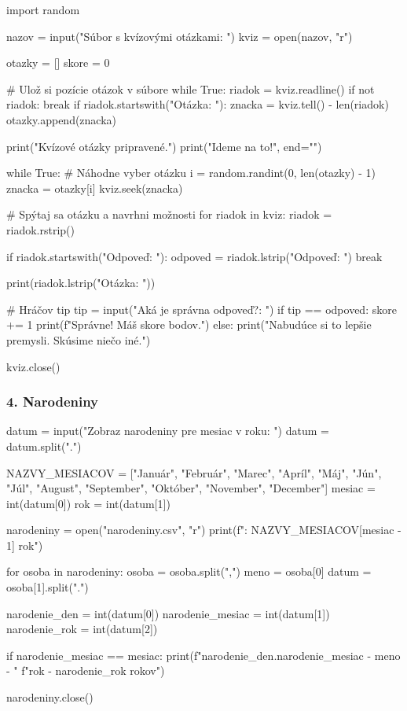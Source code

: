 \begin{solution}
import random

nazov = input("Súbor s kvízovými otázkami: ")
kviz = open(nazov, "r")

otazky = []
skore = 0

# Ulož si pozície otázok v súbore
while True:
    riadok = kviz.readline()
    if not riadok:
        break
    if riadok.startswith("Otázka: "):
        znacka = kviz.tell() - len(riadok)
        otazky.append(znacka)

print("Kvízové otázky pripravené.")
print("Ideme na to!", end="\n\n")

while True:
    # Náhodne vyber otázku
    i = random.randint(0, len(otazky) - 1)
    znacka = otazky[i]
    kviz.seek(znacka)

    # Spýtaj sa otázku a navrhni možnosti
    for riadok in kviz:
        riadok = riadok.rstrip()

        if riadok.startswith("Odpoveď: "):
            odpoved = riadok.lstrip("Odpoveď: ")
            break

        print(riadok.lstrip("Otázka: "))

    # Hráčov tip
    tip = input("Aká je správna odpoveď?: ")
    if tip == odpoved:
        skore += 1
        print(f"Správne! Máš {skore} bodov.\n")
    else:
        print("Nabudúce si to lepšie premysli. Skúsime niečo iné.\n")

kviz.close()
\end{solution}


\subsubsection*{4. Narodeniny}

\begin{solution}
datum = input("Zobraz narodeniny pre mesiac v roku: ")
datum = datum.split(".")

NAZVY_MESIACOV = ["Január", "Február", "Marec", "Apríl", "Máj", "Jún", "Júl",
                  "August", "September", "Október", "November", "December"]
mesiac = int(datum[0])
rok = int(datum[1])

narodeniny = open("narodeniny.csv", "r")
print(f"\nNarodeniny: {NAZVY_MESIACOV[mesiac - 1]} {rok}")

for osoba in narodeniny:
    osoba = osoba.split(",")
    meno = osoba[0]
    datum = osoba[1].split(".")

    narodenie_den = int(datum[0])
    narodenie_mesiac = int(datum[1])
    narodenie_rok = int(datum[2])

    if narodenie_mesiac == mesiac:
        print(f"{narodenie_den}.{narodenie_mesiac} - {meno} - "
              f"{rok - narodenie_rok} rokov")

narodeniny.close()
\end{solution}


